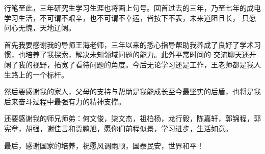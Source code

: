 \thesisacknowledgement

行笔至此，三年研究生学习生涯也将画上句号。回首过去的三年，乃至七年的成电学习生活，不可谓不艰辛，也不可谓不幸运，皆按下不表，未来道阻且长，
只愿问心无愧，天地辽阔。

首先我要感谢我的导师王海老师，三年以来的悉心指导帮助我养成了良好了学术习惯，也培养了我探索，解决未知领域问题的能力。此外平常时间的
交流聊天还开阔了我的视野，拓宽了看待问题的角度。今后无论学习还是工作，王老师都是我人生路上的一个标杆。

然后要感谢我的家人，父母的支持与帮助是我能成长至今最坚实的后盾，也将是我后来奋斗过程中最强有力的精神支撑。

还要感谢我的师兄师弟：何文俊，柒文杰，祖柏杨，龙行毅，陈嘉轩，郭锦程，郭宪章，胡强，谢佳言和贾鹏旭，愿你们前程似景，学习进步，生活如意。

最后，感谢国家的培养，祝愿风调雨顺，国泰民安，世界和平！
